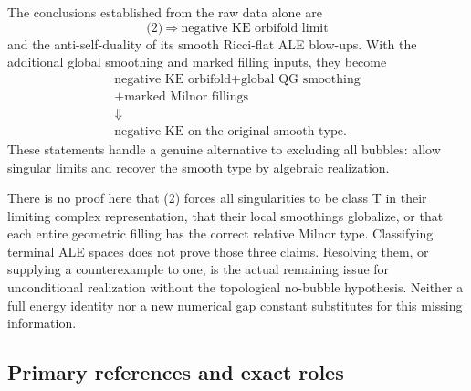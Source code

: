 \documentclass[
  11pt,
]{article}
\begin{document}
The conclusions established from the raw data alone are \[
 \boxed{\text{(2)}\ \Longrightarrow\ \text{negative KE orbifold limit}}
\] and the anti-self-duality of its smooth Ricci-flat ALE blow-ups. With
the additional global smoothing and marked filling inputs, they become
\[
 \boxed{\begin{gathered}
       \text{negative KE orbifold} +\text{global QG smoothing}\\
       +\text{marked Milnor fillings}\\
       \Downarrow\\
       \text{negative KE on the original smooth type}.
       \end{gathered}}
\] These statements handle a genuine alternative to excluding all
bubbles: allow singular limits and recover the smooth type by algebraic
realization.

There is no proof here that (2) forces all singularities to be class T
in their limiting complex representation, that their local smoothings
globalize, or that each entire geometric filling has the correct
relative Milnor type. Classifying terminal ALE spaces does not prove
those three claims. Resolving them, or supplying a counterexample to
one, is the actual remaining issue for unconditional realization without
the topological no-bubble hypothesis. Neither a full energy identity nor
a new numerical gap constant substitutes for this missing information.

\hypertarget{primary-references-and-exact-roles}{%
\subsection{Primary references and exact
roles}\label{primary-references-and-exact-roles}}
\end{document}
